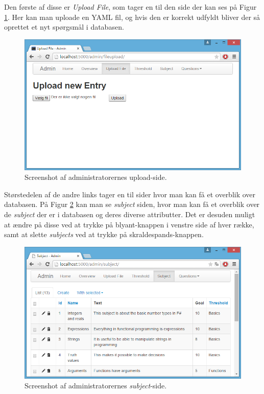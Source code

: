\documentclass[11pt, a4paper]{article}
\begin{document}
Den første af disse er \emph{Upload File}, som tager en til den side der kan ses på Figur \ref{fig:screenshot_admin_upload}. Her kan man uploade en YAML fil, og hvis den er korrekt udfyldt bliver der så oprettet et nyt spørgsmål i databasen.

\begin{figure}[htpb]
    \centering
    \includegraphics[width=1\linewidth]{figures/interface/admin_upload.png}
    \caption{Screenshot af administratorernes upload-side.}
    \label{fig:screenshot_admin_upload}
\end{figure}

Størstedelen af de andre links tager en til sider hvor man kan få et overblik over databasen. På Figur \ref{fig:screenshot_admin_subject} kan man se \emph{subject} siden, hvor man kan få et overblik over de \emph{subject} der er i databasen og deres diverse attributter. Det er desuden muligt at ændre på disse ved at trykke på blyant-knappen i venstre side af hver række, samt at slette \emph{subjects} ved at trykke på skraldespands-knappen.

\begin{figure}[htpb]
    \centering
    \includegraphics[width=1\linewidth]{figures/interface/admin_subject.png}
    \caption{Screenshot af administratorernes \emph{subject}-side.}
    \label{fig:screenshot_admin_subject}
\end{figure}
\end{document}

